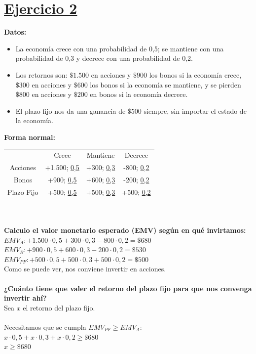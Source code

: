 \documentclass{article}
\newcommand{\ulcolor}[2][Red]{\setulcolor{#1}\ul{#2}}
\begin{document}
    \section*{\underline{Ejercicio 2}}
        \textbf{Datos:}
            \begin{itemize}
                \item La economía crece con una probabilidad de 0,5; se mantiene con una probabilidad de 0,3 y decrece con una probabilidad de 0,2.
                \item Los retornos son: $\$1.500$ en acciones y $\$900$ los bonos si la economía crece, $\$300$ en acciones y $\$600$ los bonos si la economía se mantiene, y se pierden $\$800$ en acciones y $\$200$ en bonos si la economía decrece.
                \item El plazo fijo nos da una ganancia de $\$500$ siempre, sin importar el estado de la economía.
            \end{itemize}
        \textbf{Forma normal:}
            \begin{table}[h]
                \begin{tabular}{cccc}
                                &            Crece              &           Mantiene            &         Decrece           \\
                    Acciones    & +1.500; \ulcolor[Green]{0,5}  & +300; \ulcolor[Yellow]{0,3}   & -800; \ulcolor[Red]{0,2}  \\
                    Bonos       & +900; \ulcolor[Green]{0,5}    & +600; \ulcolor[Yellow]{0,3}   & -200; \ulcolor[Red]{0,2}  \\
                    Plazo Fijo  & +500; \ulcolor[Green]{0,5}    & +500; \ulcolor[Yellow]{0,3}   & +500; \ulcolor[Red]{0,2}  \\
                \end{tabular}
            \end{table}
        \\
        \\
        \textbf{Calculo el valor monetario esperado (EMV) según en qué invirtamos:}
        \\
        $EMV_{A}: +1.500 \cdot 0,5 + 300 \cdot 0,3 - 800 \cdot 0,2 = \$680$
        \\
        $EMV_{B}: +900 \cdot 0,5 + 600 \cdot 0,3 - 200 \cdot 0,2 = \$530$
        \\
        $EMV_{PF}: +500 \cdot 0,5 + 500 \cdot 0,3 + 500 \cdot 0,2 = \$500$
        \\
        Como se puede ver, nos conviene invertir en acciones.
        \\
        \\
        \textbf{¿Cuánto tiene que valer el retorno del plazo fijo para que nos convenga invertir ahí?}
        \\
        Sea $x$ el retorno del plazo fijo.
        \\
        \\
        Necesitamos que se cumpla $EMV_{PF} \geq EMV_{A}$:
        \\
        $x \cdot 0,5 + x \cdot 0,3 + x \cdot 0,2 \geq \$680$
        \\
        $x \geq \$680$
\end{document}
